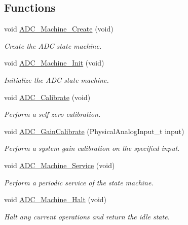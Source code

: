 \subsection*{Functions}
\begin{DoxyCompactItemize}
\item 
void \hyperlink{group__adc__statemachine_gaf9ab485b0fb6ddf69c8bfb43597ab06b}{A\-D\-C\-\_\-\-Machine\-\_\-\-Create} (void)
\begin{DoxyCompactList}\small\item\em Create the A\-D\-C state machine. \end{DoxyCompactList}\item 
void \hyperlink{group__adc__statemachine_gaabf53da7a14f298b049ed2ad432b0ed6}{A\-D\-C\-\_\-\-Machine\-\_\-\-Init} (void)
\begin{DoxyCompactList}\small\item\em Initialize the A\-D\-C state machine. \end{DoxyCompactList}\item 
void \hyperlink{group__adc__statemachine_ga7eb6744d5738bf35b1cb86b44cdc99ad}{A\-D\-C\-\_\-\-Calibrate} (void)
\begin{DoxyCompactList}\small\item\em Perform a self zero calibration. \end{DoxyCompactList}\item 
void \hyperlink{group__adc__statemachine_ga91d632b5c373982d2554840a65e89758}{A\-D\-C\-\_\-\-Gain\-Calibrate} (Physical\-Analog\-Input\-\_\-t input)
\begin{DoxyCompactList}\small\item\em Perform a system gain calibration on the specified input. \end{DoxyCompactList}\item 
void \hyperlink{group__adc__statemachine_ga89889fc7c9dba41da2ab451fe5e06d68}{A\-D\-C\-\_\-\-Machine\-\_\-\-Service} (void)
\begin{DoxyCompactList}\small\item\em Perform a periodic service of the state machine. \end{DoxyCompactList}\item 
void \hyperlink{group__adc__statemachine_ga6424732e3475cc653a8e7cd3598555f5}{A\-D\-C\-\_\-\-Machine\-\_\-\-Halt} (void)
\begin{DoxyCompactList}\small\item\em Halt any current operations and return the idle state. \end{DoxyCompactList}\item 

\end{DoxyCompactItemize}
